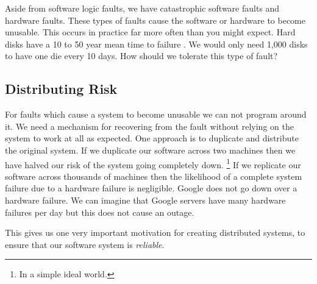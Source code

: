 Aside from software logic faults,
we have catastrophic software faults and hardware faults.
These types of faults cause the software or hardware to become unusable.
This occurs in practice far more often than you might expect.
Hard disks have a 10 to 50 year mean time to failure \cite{data-intensive}.
We would only need 1,000 disks to have one die every 10 days.
How should we tolerate this type of fault?

\subsection{Distributing Risk}
For faults which cause a system to become unusable we can not program around it.
We need a mechanism for recovering from the fault without relying on the system to work at all as expected.
One approach is to duplicate and distribute the original system.
If we duplicate our software across two machines then we have halved our risk of the system going completely down.%
\footnote{In a simple ideal world.}
If we replicate our software across thousands of machines then the likelihood of a complete system failure due to a hardware failure is negligible.
Google does not go down over a hardware failure.
We can imagine that Google servers have many hardware failures per day but this does not cause an outage.

This gives us one very important motivation for creating distributed systems,
to ensure that our software system is \textit{reliable}.




